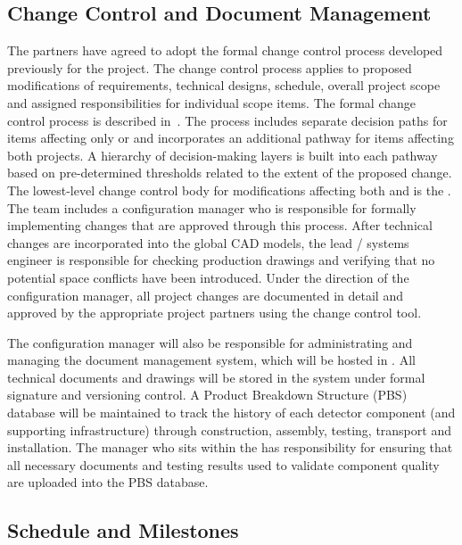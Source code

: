 \subsection{Change Control and Document Management}
\label{sec:dune_changecontrol}

The  partners have agreed to adopt the formal change
control process developed previously for the  project.
The change control process applies to proposed modifications of
requirements, technical designs, schedule, overall project scope and
assigned responsibilities for individual scope items.  The formal
 change control process is described in~. 
The process includes separate decision paths for items affecting only
 or  and incorporates an additional pathway
for items affecting both projects.  A hierarchy of decision-making
layers is built into each pathway based on pre-determined thresholds
related to the extent of the proposed change.  The lowest-level change
control body for modifications affecting both  and
 is the .  The  team includes a
configuration manager who is responsible for formally implementing
changes that are approved through this process.  After technical
changes are incorporated into the global \threed CAD models, the lead
/ systems engineer is responsible for checking production
drawings and verifying that no potential space conflicts have been
introduced.  Under the direction of the configuration manager, all
project changes are documented in detail and approved %
by the
appropriate project partners using the  change control tool.

The configuration manager will also be responsible for administrating
and managing the  document management system, which will
be hosted in .  All technical documents and drawings will be
stored in the  system under formal signature and
versioning control.  A Product Breakdown Structure (PBS) database will
be maintained to track the history of each detector  component (and supporting
infrastructure) through construction, assembly, testing, %
transport and installation.  The   manager who
sits within the  has responsibility for ensuring that all
necessary documents and testing results used to validate component
quality are uploaded into the PBS database.

\subsection{Schedule and Milestones}
\label{sec:dune_schedule}

